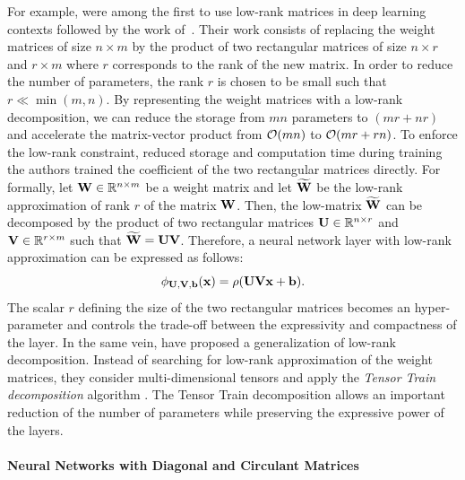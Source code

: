 \noindent
For example, \citet{sainath2013lowrank} were among the first to use low-rank matrices in deep learning contexts followed by the work of~\citet{jaderberg2014speeding,yu2017compressing}.
Their work consists of replacing the weight matrices of size $n \times m$ by the product of two rectangular matrices of size $n \times r$ and $r \times m$ where $r$ corresponds to the rank of the new matrix. 
In order to reduce the number of parameters, the rank $r$ is chosen to be small such that $r \ll \min(m, n)$.
By representing the weight matrices with a low-rank decomposition, we can reduce the storage from $mn$ parameters to $(mr + nr)$ and accelerate the matrix-vector product from $\mathcal{O}(mn)$ to $\mathcal{O}(mr + rn)$.
To enforce the low-rank constraint, reduced storage and computation time during training the authors trained the coefficient of the two rectangular matrices directly. 
For formally, let $\mathbf{W} \in \mathbb{R}^{n \times m}$ be a weight matrix and let $\widetilde{\mathbf{W}}$ be the low-rank approximation of rank $r$ of the matrix $\mathbf{W}$.
Then, the low-matrix $\widetilde{\mathbf{W}}$ can be decomposed by the product of two rectangular matrices $\mathbf{U} \in \mathbb{R}^{n \times r}$ and $\mathbf{V} \in \mathbb{R}^{r \times m}$ such that $\widetilde{\mathbf{W}} = \mathbf{U} \mathbf{V}$.
Therefore, a neural network layer with low-rank approximation can be expressed as follows:
\begin{equation}
  \layer_{\Umat, \Vmat, \bvec} (\xvec) = \act\left( \Umat \Vmat \xvec + \bvec \right) .
\end{equation}
The scalar $r$ defining the size of the two rectangular matrices becomes an hyper-parameter and controls the trade-off between the expressivity and compactness of the layer. 
In the same vein, \citet{novikov2015tensorizing} have proposed a generalization of low-rank decomposition.
Instead of searching for low-rank approximation of the weight matrices, they consider multi-dimensional tensors and apply the \emph{Tensor Train decomposition} algorithm \cite{oseledets2011tensor}.
The Tensor Train decomposition allows an important reduction of the number of parameters while preserving the expressive power of the layers.


\paragraph{Neural Networks with Diagonal and Circulant Matrices} ~\\

